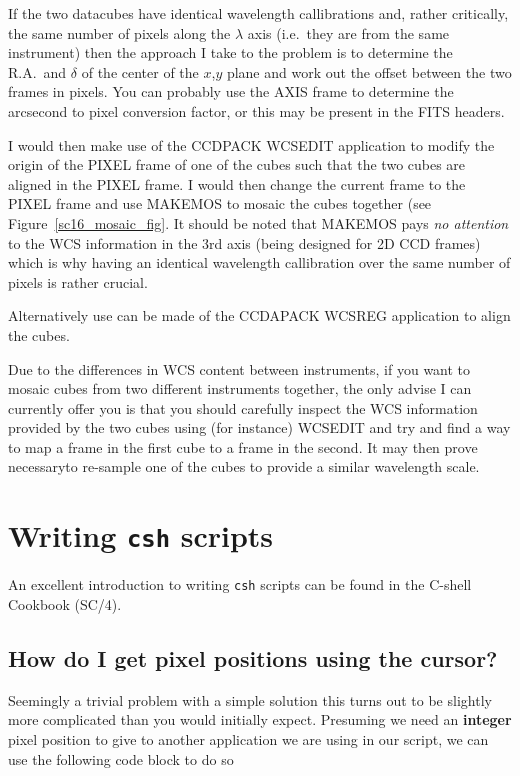 \documentclass[twoside,11pt]{article}
\newcommand{\xref}[3]{#1}
\newcommand{\xlabel}[1]{}
\begin{document}
If the two datacubes have identical wavelength callibrations and, rather critically, the same number of pixels along the $\lambda$ axis (i.e.\ they are from the same instrument) then the approach I take to the problem is to determine the R.A.\ and $\delta$ of the center of the $x$,$y$ plane and work out the offset between the two frames in pixels. You can probably use the AXIS frame to determine the arcsecond to pixel conversion factor, or this may be present in the FITS headers.

I would then make use of the CCDPACK \xref{WCSEDIT}{sun139}{WCSEDIT} application to modify the origin of the PIXEL frame of one of the cubes such that the two cubes are aligned in the PIXEL frame. I would then change the current frame to the PIXEL frame and use \xref{MAKEMOS}{sun139}{MAKEMOS} to mosaic the cubes together (see Figure~\ref{sc16_mosaic_fig}. It should be noted that MAKEMOS pays {\em no attention} to the WCS information in the 3rd axis (being designed for 2D CCD frames) which is why having an identical wavelength callibration over the same number of pixels is rather crucial.

Alternatively use can be made of the CCDAPACK \xref{WCSREG}{sun139}{WCSREG} application to align the cubes.

Due to the differences in WCS content between instruments, if you want to mosaic cubes from two different instruments together, the only advise I can currently offer you is that you should carefully inspect the WCS information provided by the two cubes using (for instance) \xref{WCSEDIT}{sun139}{WCSEDIT} and try and find a way to map a frame in the first cube to a frame in the second. It may then prove necessaryto re-sample one of the cubes to provide a similar wavelength scale.

\section{\xlabel{sc16_writingcsh}Writing {\tt csh} scripts\label{sc16_writingcsh}}

An excellent introduction to writing {\tt csh} scripts can be found in the \xref{C-shell Cookbook}{sc4}{} (SC/4).

\subsection{How do I get pixel positions using the cursor?}

Seemingly a trivial problem with a simple solution this turns out to be slightly more complicated than you would initially expect. Presuming we need an {\bf integer} pixel position to give to another application we are using in our script, we can use the following code block to do so
\end{document}
